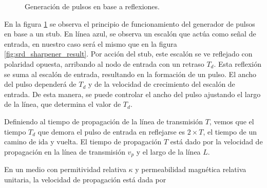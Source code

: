 \begin{figure}[h!]
    \centering
    \caption{Generación de pulsos en base a reflexiones.}
    \label{fig:stub_time_domain_waveforms}
\end{figure}

En la figura \ref{fig:stub_time_domain_waveforms} se observa el principio de
funcionamiento del generador de pulsos en base a un stub. En línea azul, se
observa un escalón que actúa como señal de entrada, en nuestro caso será el
mismo que en la figura \ref{fig:srd_sharpener_result}. Por acción del stub, este
escalón se ve reflejado con polaridad opuesta, arribando al nodo de entrada con
un retraso $T_d$. Esta reflexión se suma al escalón de entrada, resultando en la
formación de un pulso. El ancho del pulso dependerá de $T_d$ y de la velocidad
de crecimiento del escalón de entrada. De esta manera, se puede controlar el
ancho del pulso ajustando el largo de la línea, que determina el valor de $T_d$.

Definiendo al tiempo de propagación de la línea de transmisión $T$, vemos que el
tiempo $T_d$ que demora el pulso de entrada en reflejarse es $2 \times T$, el tiempo de
un camino de ida y vuelta.  El tiempo de propagación $T$ está dado por la
velocidad de propagación en la línea de transmisión $v_p$ y el largo de la línea
$L$.

En un medio con permitividad relativa $\kappa$ y permeabilidad magnética
relativa unitaria, la velocidad de propagación está dada por \cite{pozar2011}

